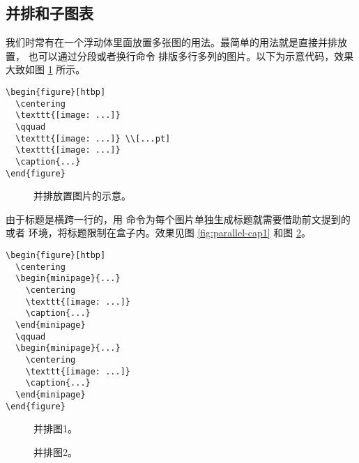 \subsection{并排和子图表}\label{subsec:subfig}

我们时常有在一个浮动体里面放置多张图的用法。最简单的用法就是直接并排放置，
也可以通过分段或者换行命令 \crcmd{} 排版多行多列的图片。以下为示意代码，效果大致如图 \ref{fig:parallel-fig} 所示。
\begin{verbatim}
\begin{figure}[htbp]
  \centering
  \texttt{[image: ...]}
  \qquad
  \texttt{[image: ...]} \\[...pt]
  \texttt{[image: ...]}
  \caption{...}
\end{figure}
\end{verbatim}

\begin{figure}[htp]
  \centering
  \qquad
  \par\bigskip
  \caption{并排放置图片的示意。}\label{fig:parallel-fig}
\end{figure}

由于标题是横跨一行的，用  命令为每个图片单独生成标题就需要借助前文提到的 
或者  环境，将标题限制在盒子内。效果见图 \ref{fig:parallel-cap1} 和图 \ref{fig:parallel-cap2}。
\begin{verbatim}
\begin{figure}[htbp]
  \centering
  \begin{minipage}{...}
    \centering
    \texttt{[image: ...]}
    \caption{...}
  \end{minipage}
  \qquad
  \begin{minipage}{...}
    \centering
    \texttt{[image: ...]}
    \caption{...}
  \end{minipage}
\end{figure}
\end{verbatim}

\begin{figure}[htp]
  \centering
  \begin{minipage}{12em}
    \centering
    \caption{并排图1。}\label{fig:parallel-cap1}
  \end{minipage}
  \qquad
  \begin{minipage}{12em}
    \centering
    \caption{并排图2。}\label{fig:parallel-cap2}
  \end{minipage}
\end{figure}

